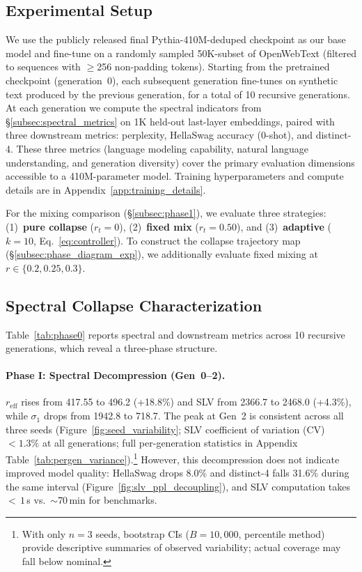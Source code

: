 
\subsection{Experimental Setup}
\label{subsec:setup}

We use the publicly released final Pythia-410M-deduped checkpoint \citep{biderman2023pythia} as our base model and fine-tune on a randomly sampled 50K-subset of OpenWebText (filtered to sequences with $\geq$256 non-padding tokens).
Starting from the pretrained checkpoint (generation~0), each subsequent generation fine-tunes on synthetic text produced by the previous generation, for a total of 10 recursive generations.
At each generation we compute the spectral indicators from \S\ref{subsec:spectral_metrics} on 1K held-out last-layer embeddings, paired with three downstream metrics: perplexity, HellaSwag accuracy (0-shot), and distinct-4.
These three metrics (language modeling capability, natural language understanding, and generation diversity) cover the primary evaluation dimensions accessible to a 410M-parameter model.
Training hyperparameters and compute details are in Appendix~\ref{app:training_details}.

For the mixing comparison (\S\ref{subsec:phase1}), we evaluate three strategies:
(1)~\textbf{pure collapse} ($r_t{=}0$),
(2)~\textbf{fixed mix} ($r_t{=}0.50$), and
(3)~\textbf{adaptive} ($k{=}10$, Eq.~\ref{eq:controller}).
To construct the collapse trajectory map (\S\ref{subsec:phase_diagram_exp}), we additionally evaluate fixed mixing at $r \in \{0.2, 0.25, 0.3\}$.

\subsection{Spectral Collapse Characterization}
\label{subsec:phase0}

Table~\ref{tab:phase0} reports spectral and downstream metrics across 10 recursive generations, which reveal a three-phase structure.

\paragraph{Phase I: Spectral Decompression (Gen~0--2).}
$r_{\text{eff}}$ rises from 417.55 to 496.2 (+18.8\%) and SLV from 2366.7 to 2468.0 (+4.3\%), while $\sigma_1$ drops from 1942.8 to 718.7.
The peak at Gen~2 is consistent across all three seeds (Figure~\ref{fig:seed_variability}; SLV coefficient of variation (CV) $< 1.3\%$ at all generations; full per-generation statistics in Appendix Table~\ref{tab:pergen_variance}).\footnote{With only $n{=}3$ seeds, bootstrap CIs ($B{=}10{,}000$, percentile method) provide descriptive summaries of observed variability; actual coverage may fall below nominal.}
However, this decompression does not indicate improved model quality: HellaSwag drops 8.0\% and distinct-4 falls 31.6\% during the same interval (Figure~\ref{fig:slv_ppl_decoupling}), and SLV computation takes ${<}\,1$\,s vs.\ ${\sim}$70\,min for benchmarks.

